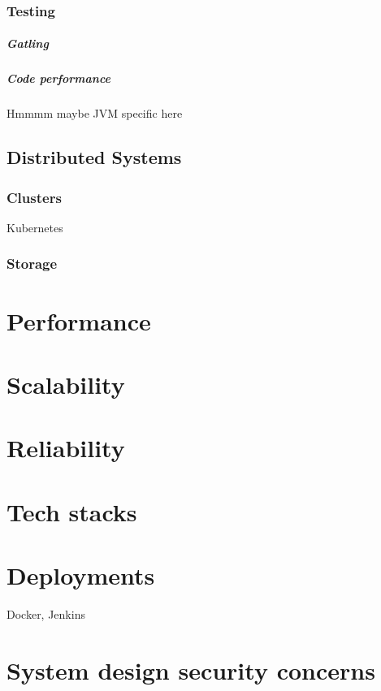\documentclass[a4paper, 11pt]{book}
\begin{document}
{    \subsection{Testing}

    \paragraph{Gatling}

    \paragraph{Code performance}
    Hmmmm maybe JVM specific here


    \section{Distributed Systems}

    \subsection{Clusters}
    Kubernetes

    \subsection{Storage}


    \chapter{Performance}


    \chapter{Scalability}


    \chapter{Reliability}


    \chapter{Tech stacks}


    \chapter{Deployments}
    Docker, Jenkins


    \chapter{System design security concerns}


}
\end{document}
